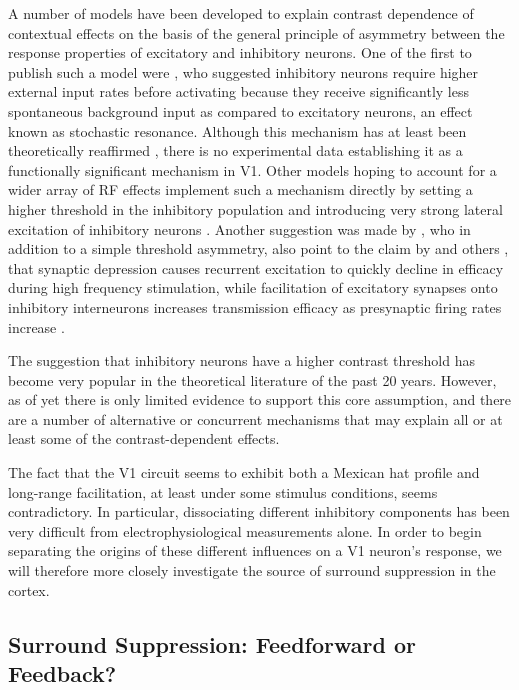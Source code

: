 A number of models have been developed to explain contrast dependence
of contextual effects on the basis of the general principle of
asymmetry between the response properties of excitatory and inhibitory
neurons. One of the first to publish such a model were
\cite{Stemmler1995}, who suggested inhibitory neurons require higher
external input rates before activating because they receive
significantly less spontaneous background input as compared to
excitatory neurons, an effect known as stochastic resonance. Although
this mechanism has at least been theoretically reaffirmed
\citep{Bezrukov1997}, there is no experimental data establishing it as
a functionally significant mechanism in V1. Other models hoping to
account for a wider array of RF effects implement such a mechanism
directly by setting a higher threshold in the inhibitory population
and introducing very strong lateral excitation of inhibitory neurons
\citep{Schwabe2006}. Another suggestion was made by \cite{Somers1998},
who in addition to a simple threshold asymmetry, also point to the
claim by \cite{Thomson1994} and others \citep{Abbott1997,Tsodyks1997},
that synaptic depression causes recurrent excitation to quickly
decline in efficacy during high frequency stimulation, while
facilitation of excitatory synapses onto inhibitory interneurons
increases transmission efficacy as presynaptic firing rates increase
\citep{Thomson1995}.

The suggestion that inhibitory neurons have a higher contrast
threshold has become very popular in the theoretical literature of the
past 20 years.  However, as of yet there is only limited evidence to
support this core assumption, and there are a number of alternative or
concurrent mechanisms that may explain all or at least some of the
contrast-dependent effects.

The fact that the V1 circuit seems to exhibit both a Mexican hat
profile and long-range facilitation, at least under some stimulus conditions,
seems contradictory. In particular, dissociating different inhibitory
components has been very difficult from electrophysiological
measurements alone. In order to begin separating the origins of these
different influences on a V1 neuron's response, we will therefore
more closely investigate the source of surround suppression in the cortex.

\subsection{Surround Suppression: Feedforward or Feedback?}

